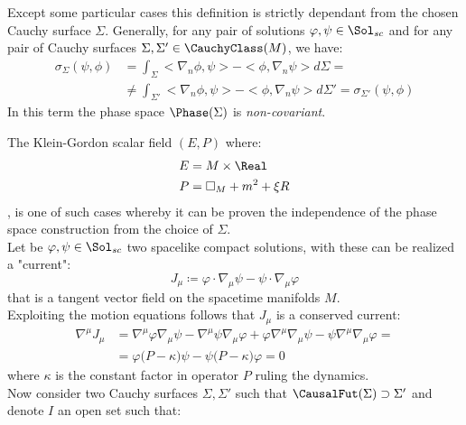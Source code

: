 \documentclass[Main]{subfiles}
\begin{document}
			Except some particular cases this definition is strictly dependant from the chosen Cauchy surface $\Sigma$.
			Generally, for any pair of solutions $\varphi, \psi \in \Sol_{sc}$ and for any pair of Cauchy surfaces 	$\Sigma, \Sigma' \in \CauchyClass(M)$, we have:
						\begin{align*}
							\sigma_\Sigma ( \psi, \phi) &= \int_\Sigma < \nabla_n \phi, \psi>  - <\phi, \nabla_n \psi > d\Sigma=\\
							&\neq \int_{\Sigma'} < \nabla_n \phi, \psi>  - <\phi, \nabla_n \psi > d\Sigma'= \sigma_{\Sigma'}(\psi,\phi)
						\end{align*}
		  In this term the phase space $\Phase(\Sigma)$ is \emph{non-covariant}.
		  
		\begin{example}\label{Ex:IndipendentPhaseSpace}
			The Klein-Gordon scalar field $(E,P)$ where:
			\begin{eqnarray}
				E &= M \times \Real \nonumber\\
				P &= \square_M + m^2 + \xi R \label{Eq:KGOperator}
			\end{eqnarray}
			, is one of such cases whereby it can be proven the independence of the phase space construction from the choice of $\Sigma$.
			\\
			Let be $\varphi, \psi \in \Sol_{sc}$ two spacelike compact solutions, with these can be realized a "current":
			\begin{displaymath}
					J_\mu \coloneqq \varphi \cdot \nabla_\mu \psi  - \psi \cdot \nabla_\mu \varphi
			\end{displaymath}
			that is a tangent vector field on the spacetime manifolds $M$.			
			\\
			Exploiting the motion equations follows that $J_\mu$ is a conserved current:
			\begin{eqnarray}\label{Eq:ScalarCurrent}
				\nabla^\mu J_\mu &= \nabla^\mu\varphi \nabla_\mu\psi  - \nabla^\mu \psi \nabla_\mu \varphi + 
				\varphi \nabla^\mu \nabla_\mu \psi - \psi \nabla^\mu \nabla_\mu \varphi	= \nonumber \\
				&=  \varphi \big( P - \kappa \big) \psi - \psi \big( P - \kappa \big) \varphi = 0 
			\end{eqnarray}
			where $\kappa$ is the constant factor in operator $P$ ruling the dynamics.
			\\
			Now consider two Cauchy surfaces $\Sigma, \Sigma'$ such that $\CausalFut(\Sigma) \supset \Sigma'$ and denote $I$ an open set such that:
			\begin{displaymath}

\end{displaymath}
\end{example}
\end{document}
